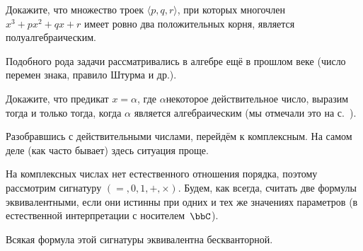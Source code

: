 \begin{problem}
Докажите, что множество троек $\langle p,q,r\rangle$,
при которых многочлен $x^3+px^2+qx+r$ имеет ровно два
положительных корня, является полуалгебраическим.
\end{problem}

Подобного рода задачи рассматривались в алгебре ещё в прошлом
веке (число перемен знака, правило Штурма%
%
и др.).

\begin{problem}
        \label{r-definability-2}%
Докажите, что предикат $x=\alpha$, где $\alpha$\т некоторое
действительное число, выразим тогда и только тогда,
когда $\alpha$ является алгебраическим (мы отмечали это на
с.~\pageref{r-definability}).
\end{problem}

Разобравшись с действительными числами, перейдём к
комплексным. На самом деле (как часто бывает) здесь ситуация
проще.

На комплексных числах нет естественного отношения порядка, поэтому
рассмотрим сигнатуру $({=},{0},{1},{+},{\times})$. Будем, как
всегда, считать две формулы эквивалентными, если
они истинны при одних и тех же значениях параметров (в
естественной интерпретации с носителем~$\bbC$).

\begin{theorem}
%
        \label{c-quantifier-elimination}%
Всякая формула этой сигнатуры эквивалентна бескванторной.
\end{theorem}

